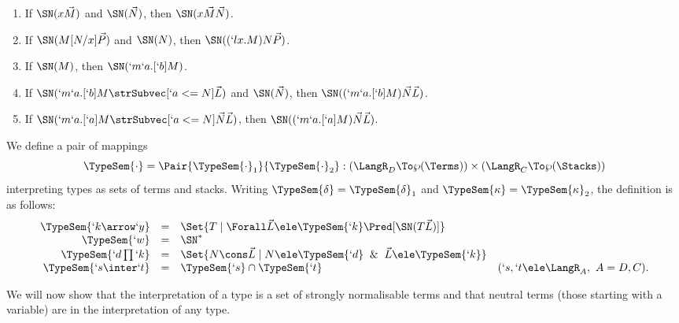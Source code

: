 \documentclass{CSML}
\newcommand{\vect}[1]{\vec{#1}}
\begin{document}
 \begin{prop} \label{SN facts}\hfill
 \begin{enumerate}
 \item \label{SN fact head application}
If $\SN(x\vect{ M })$ and $\SN(\vect{N})$, then $\SN(x\vect{ M }\vect{N})$.

 \item \label{SN fact redex}
If $\SN(M[N/x]\vect{P})$ and $\SN(N)$, then $\SN({( `lx.M)N\vect{P}})$.

 \item \label{SN fact add mu abstraction}
If $\SN(M)$, then $\SN(`m`a.[`b]M)$.

 \item \label{SN fact mu in redex}
If $\SN( `m`a.[`b]M \strSubvec[ `a <= N ] \vect{L} ) $ and $ \SN(\vect{N}) $, then $ \SN({( `m`a.[`b]M )\vect{N}\vect{L}}) $.

 \item \label{SN fact mu out redex}
If $\SN(`m`a.[`a]M \strSubvec[ `a <= N ] \vect{N} \vect{L} ) $, then $ \SN({( `m`a.[`a]M )\vect{N}\vect{L}}) $.

 \end{enumerate}
 \end{prop}


 \begin{defi} \label{TypeSem definition}
We define a pair of mappings 
 \[ \TypeSem{\cdot} = \Pair{\TypeSem{\cdot}_1}{\TypeSem{\cdot}_2}: (\LangR_D \To \wp(\Terms)) \times (\LangR_C \To \wp(\Stacks)) \] 
interpreting types as sets of terms and stacks. 
Writing $\TypeSem{\delta} = \TypeSem{\delta}_1$ and $\TypeSem{\kappa} = \TypeSem{\kappa}_2$, the definition is 
as follows:
%
 \[ \begin{array}{rcl@{\quad}l}
 \TypeSem{`k\arrow `y} &=& \Set{T \mid \Forall \vect{L} \ele \TypeSem{`k } \Pred[\SN(T \vect{L}) ] } 
 \\ 
 \TypeSem{`w} &=& \SN^* 
	\\
 \TypeSem{`d\prod `k } &=& \Set{N \cons \vect{L} \mid N \ele \TypeSem{`d} \And \vect{L} \ele \TypeSem{`k }} 
 \\ 
 \TypeSem{`s \inter `t} &=& \TypeSem{`s} \cap \TypeSem{`t} & (`s,`t \ele \LangR_A,~ A = D,C). 
 \end{array} \]

 \end{defi}

We will now show that the interpretation of a type is a set of strongly normalisable terms and that neutral terms (those starting with a variable) are in the interpretation of any type.
\end{document}
